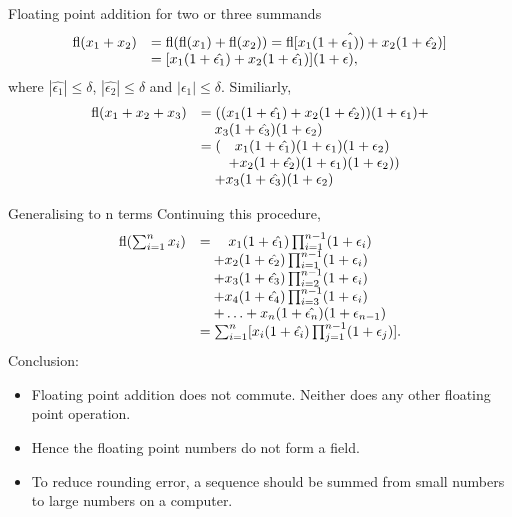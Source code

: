 \documentclass{beamer}
\begin{document}
\begin{frame}{Floating point addition for two or three summands}
\begin{equation*}
\begin{array}{rl}
\text{fl}(x_1 + x_2) &= \text{fl}(\text{fl}(x_1) + \text{fl}(x_2)) = \text{fl}[x_1(1 + \hat{\epsilon_1)}) + x_2(1 + \hat{\epsilon_2})] \\
&= [x_1 (1 + \hat{\epsilon_1}) + x_2 (1 + \hat{\epsilon_1})] (1 + \epsilon),
\end{array}
\end{equation*}
where
$|\hat{\epsilon_1}| \leq \delta$, $|\hat{\epsilon_2}| \leq \delta$ and $|\epsilon_1| \leq \delta$. Similiarly,
\begin{equation*}
\begin{array}{rl}
\text{fl}(x_1 + x_2 + x_3) &= ((x_1 (1 + \hat{\epsilon_1}) + x_2 (1 + \hat{\epsilon_2}))(1 + \epsilon_1) + \\
& \quad x_3 (1 + \hat{\epsilon_3})(1 + \epsilon_2) \\
& = (\quad x_1 (1 + \hat{\epsilon_1}) (1 + \epsilon_1) (1 + \epsilon_2) \\
	&\qquad + x_2 (1 + \hat{\epsilon_2}) (1 + \epsilon_1) (1 + \epsilon_2)) \\
	&\quad + x_3 (1 + \hat{\epsilon_3}) (1 + \epsilon_2)
\end{array}
\end{equation*}
\end{frame}

\begin{frame}{Generalising to n terms}
Continuing this procedure,
\begin{equation*}
\begin{array}{rl}
\text{fl}(\sum_{i=1}^n x_i) &= \quad x_1 (1 + \hat{\epsilon_1}) \prod_{i=1}^{n-1} (1 + \epsilon_i) \\
&\quad + x_2 (1 + \hat{\epsilon_2}) \prod_{i=1}^{n-1} (1 + \epsilon_i) \\
&\quad + x_3 (1 + \hat{\epsilon_3}) \prod_{i=2}^{n-1} (1 + \epsilon_i) \\
&\quad + x_4 (1 + \hat{\epsilon_4}) \prod_{i=3}^{n-1} (1 + \epsilon_i) \\
&\quad + \ldots + x_n (1 + \hat{\epsilon_n}) (1 + \epsilon_{n-1}) \\
&= \sum_{i=1}^n [x_i (1 + \hat{\epsilon_i}) \prod_{j=1}^{n-1} (1 + \epsilon_j)].
\end{array}
\end{equation*}
Conclusion: 
\begin{itemize}
\item Floating point addition does not commute. Neither does any other floating point
			operation.
\item Hence the floating point numbers do not form a field.
\item To reduce rounding error, a sequence should be summed from small numbers to large numbers on a
computer.
\end{itemize}
\end{frame}
\end{document}
